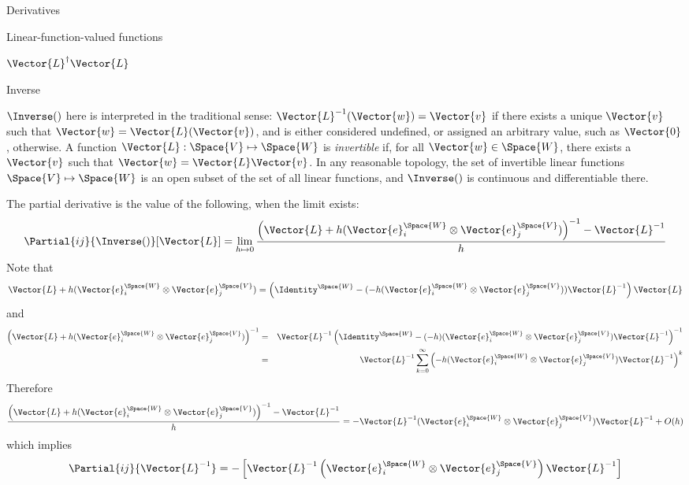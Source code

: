 \begin{plSection}{Derivatives}
\begin{plSection}{Linear-function-valued functions}
\begin{plSection}{\texorpdfstring{$\Vector{L}^{\dagger} \Vector{L}$}{LTL}}
\end{plSection}%
\begin{plSection}{Inverse}
\label{sec:Derivative-of-inverse}

$\Inverse()$ here is interpreted in the traditional sense:
$\Vector{L}^{-1}(\Vector{w}) = \Vector{v}$ if there exists a unique $\Vector{v}$ such that $\Vector{w} = \Vector{L}(\Vector{v})$,
and is either considered undefined, or assigned an arbitrary
value, such as $\Vector{0}$, otherwise.
A function $\Vector{L} : \Space{V} \mapsto \Space{W}$ is \textit{invertible}
if, for all $\Vector{w} \in \Space{W}$, there exists a $\Vector{v}$ such that
$\Vector{w} = \Vector{L} \Vector{v}$.
In any reasonable topology,
the set of invertible linear functions $\Space{V} \mapsto \Space{W}$
is an open subset of the set of all linear functions,
and $\Inverse()$ is continuous and differentiable there.

The partial derivative is the value of the following, when the limit exists:
\begin{displaymath}
\Partial{ij}{\Inverse()}[\Vector{L}]
 =
\lim_{ h \mapsto 0}
\frac{ \left( \Vector{L} + h (\Vector{e}_i^{\Space{W}} \otimes \Vector{e}_j^{\Space{V}}) \right)^{-1} - \Vector{L}^{-1} }{h}
\end{displaymath}
Note that
\begin{displaymath}
\Vector{L} + h (\Vector{e}_i^{\Space{W}} \otimes \Vector{e}_j^{\Space{V}})
 =
\left( \Identity^{\Space{W}} - ( -h ( \Vector{e}_i^{\Space{W}} \otimes \Vector{e}_j^{\Space{V}} )) \Vector{L}^{-1} \right) \Vector{L}
\end{displaymath}
and
\begin{eqnarray*}
\left( \Vector{L} + h (\Vector{e}_i^{\Space{W}} \otimes \Vector{e}_j^{\Space{V}}) \right)^{-1}
& = &
\Vector{L}^{-1} \left( \Identity^{\Space{W}} - ( -h )( \Vector{e}_i^{\Space{W}} \otimes \Vector{e}_j^{\Space{V}} ) \Vector{L}^{-1} \right)^{-1}
\\
& = &
\Vector{L}^{-1} \sum_{k=0}^{\infty} \left( -h ( \Vector{e}_i^{\Space{W}} \otimes \Vector{e}_j^{\Space{V}} ) \Vector{L}^{-1} \right)^{k}
\nonumber
\end{eqnarray*}
Therefore
\begin{displaymath}
\frac{ \left( \Vector{L} + h (\Vector{e}_i^{\Space{W}} \otimes \Vector{e}_j^{\Space{V}}) \right)^{-1} - \Vector{L}^{-1} }{h}
 =
- \Vector{L}^{-1} ( \Vector{e}_i^{\Space{W}} \otimes \Vector{e}_j^{\Space{V}} )  \Vector{L}^{-1} + O(h)
\end{displaymath}
which implies
\begin{equation}
\Partial{ij}{\Vector{L}^{-1}}
 =
- \left[
\Vector{L}^{-1}
\left( \Vector{e}_i^{\Space{W}} \otimes \Vector{e}_j^{\Space{V}} \right)
\Vector{L}^{-1}
\right]
\end{equation}


\end{plSection}
\end{plSection}
\end{plSection}
